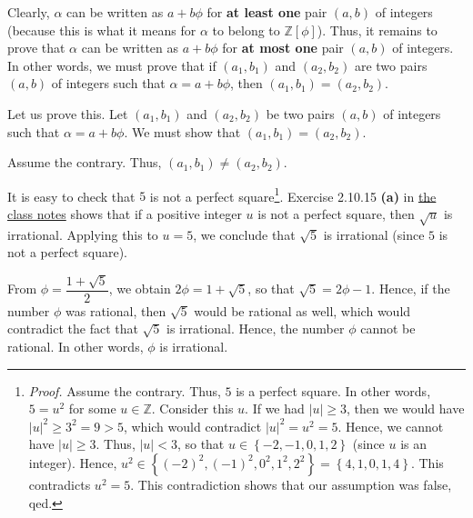 \documentclass[paper=a4, fontsize=12pt]{scrartcl}%
\theoremstyle{plainsl}
\theoremstyle{definition}
\theoremstyle{remark}
\begin{document}
Clearly, $\alpha$ can be written as $a+b\phi$ for \textbf{at least one} pair
$\left(  a,b\right)  $ of integers (because this is what it means for $\alpha$
to belong to $\mathbb{Z}\left[  \phi\right]  $). Thus, it remains to prove
that $\alpha$ can be written as $a+b\phi$ for \textbf{at most one} pair
$\left(  a,b\right)  $ of integers. In other words, we must prove that if
$\left(  a_{1},b_{1}\right)  $ and $\left(  a_{2},b_{2}\right)  $ are two
pairs $\left(  a,b\right)  $ of integers such that $\alpha=a+b\phi$, then
$\left(  a_{1},b_{1}\right)  =\left(  a_{2},b_{2}\right)  $.

Let us prove this. Let $\left(  a_{1},b_{1}\right)  $ and $\left(  a_{2}%
,b_{2}\right)  $ be two pairs $\left(  a,b\right)  $ of integers such that
$\alpha=a+b\phi$. We must show that $\left(  a_{1},b_{1}\right)  =\left(
a_{2},b_{2}\right)  $.

Assume the contrary. Thus, $\left(  a_{1},b_{1}\right)  \neq\left(
a_{2},b_{2}\right)  $.

It is easy to check that $5$ is not a perfect square\footnote{\textit{Proof.}
Assume the contrary. Thus, $5$ is a perfect square. In other words, $5=u^{2}$
for some $u\in\mathbb{Z}$. Consider this $u$. If we had $\left\vert
u\right\vert \geq3$, then we would have $\left\vert u\right\vert ^{2}\geq
3^{2}=9>5$, which would contradict $\left\vert u\right\vert ^{2}=u^{2}=5$.
Hence, we cannot have $\left\vert u\right\vert \geq3$. Thus, $\left\vert
u\right\vert <3$, so that $u\in\left\{  -2,-1,0,1,2\right\}  $ (since $u$ is
an integer). Hence, $u^{2}\in\left\{  \left(  -2\right)  ^{2},\left(
-1\right)  ^{2},0^{2},1^{2},2^{2}\right\}  =\left\{  4,1,0,1,4\right\}  $.
This contradicts $u^{2}=5$. This contradiction shows that our assumption was
false, qed.}. Exercise 2.10.15 \textbf{(a)} in
\href{http://www.cip.ifi.lmu.de/~grinberg/t/19s/notes.pdf}{the class notes}
shows that if a positive integer $u$ is not a perfect square, then $\sqrt{u}$
is irrational. Applying this to $u=5$, we conclude that $\sqrt{5}$ is
irrational (since $5$ is not a perfect square).

From $\phi=\dfrac{1+\sqrt{5}}{2}$, we obtain $2\phi=1+\sqrt{5}$, so that
$\sqrt{5}=2\phi-1$. Hence, if the number $\phi$ was rational, then $\sqrt{5}$
would be rational as well, which would contradict the fact that $\sqrt{5}$ is
irrational. Hence, the number $\phi$ cannot be rational. In other words,
$\phi$ is irrational.
\end{document}
